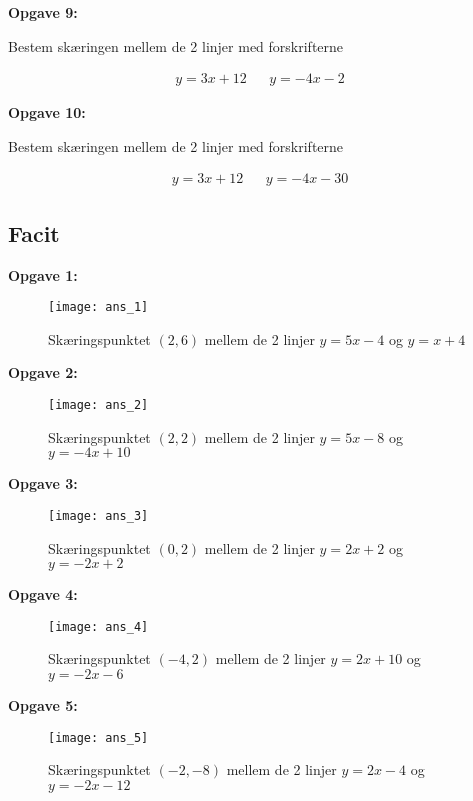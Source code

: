 \textbf{Opgave 9:}

Bestem skæringen mellem de 2 linjer med forskrifterne 

\begin{align*}
y = 3x +12 &&  y = -4x -2
\end{align*}

\textbf{Opgave 10:}

Bestem skæringen mellem de 2 linjer med forskrifterne 

\begin{align*}
y = 3x +12 &&  y = -4x -30
\end{align*}


\newpage


\subsection*{Facit}


\textbf{Opgave 1:}

\begin{figure}[ht]
\texttt{[image: ans\_1]}
\caption{Skæringspunktet $(2,6)$ mellem de 2 linjer $y = 5x - 4$ og $y = x + 4$}
\end{figure}

\textbf{Opgave 2:}

\begin{figure}[ht]
\texttt{[image: ans\_2]}
\caption{Skæringspunktet $(2,2)$ mellem de 2 linjer $y = 5x - 8$ og $y = -4x + 10$}
\end{figure}

\textbf{Opgave 3:}

\begin{figure}[ht]
\texttt{[image: ans\_3]}
\caption{Skæringspunktet $(0,2)$ mellem de 2 linjer $y = 2x + 2$ og $y = -2x + 2$}
\end{figure}

\newpage

\textbf{Opgave 4:}

\begin{figure}[ht]
\texttt{[image: ans\_4]}
\caption{Skæringspunktet $(-4,2)$ mellem de 2 linjer $y = 2x + 10$ og $y = -2x -6$}
\end{figure}

\textbf{Opgave 5:}

\begin{figure}[ht]
\texttt{[image: ans\_5]}
\caption{Skæringspunktet $(-2,-8)$ mellem de 2 linjer $y = 2x - 4$ og $y = -2x -12$}
\end{figure}

